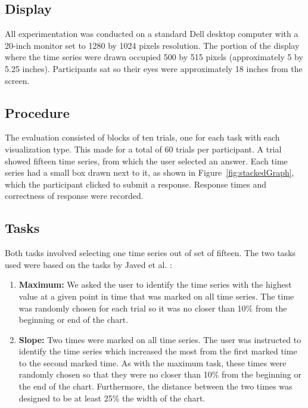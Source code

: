 \documentclass{article}
\begin{document}
\subsection{Display}

All experimentation was conducted on a standard Dell desktop computer with a 20-inch monitor set to 1280 by 1024 pixels resolution.  The portion of the display where the time series were drawn occupied 500 by 515 pixels (approximately 5 by 5.25 inches).  Participants sat so their eyes were approximately 18 inches from the screen.

\subsection{Procedure}

The evaluation consisted of blocks of ten trials, one for each task with each visualization type.  This made for a total of 60 trials per participant.  A trial showed fifteen time series, from which the user selected an answer.  Each time series had a small box drawn next to it, as shown in Figure~\ref{fig:stackedGraph}, which the participant clicked to submit a response.  Response times and correctness of response were recorded.

\subsection{Tasks}

Both tasks involved selecting one time series out of set of fifteen.  The two tasks used were based on the tasks by Javed et al. \cite{javed2010}:
\begin{enumerate}
\item \textbf{Maximum:} We asked the user to identify the time series with the highest value at a given point in time that was marked on all time series.  The time was randomly chosen for each trial so it was no closer than 10\% from the beginning or end of the chart.
\item \textbf{Slope:} Two times were marked on all time series.  The user was instructed to identify the time series which increased the most from the first marked time to the second marked time.  As with the maximum task, these times were randomly chosen so that they were no closer than 10\% from the beginning or the end of the chart.  Furthermore, the distance between the two times was designed to be at least 25\% the width of the chart.
\end{enumerate}
\end{document}
